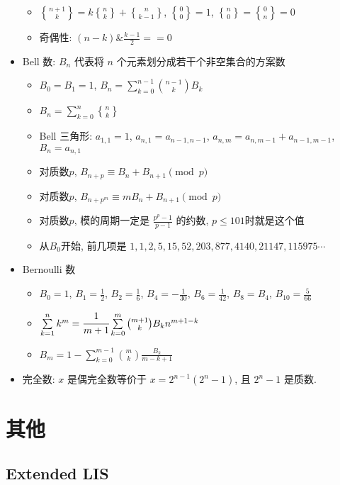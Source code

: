 \documentclass[landscape, twocolumn, 8pt, a4paper, twoside]{extarticle}
\newcommand{\stls}[2]{\genfrac{ \{ }{ \} }{0pt}{}{#1}{#2}}
\begin{document}
\begin{itemize}
\begin{itemize}
  \item $\stls{n + 1}{k} = k\stls{n}{k} + \stls{n}{k - 1}$, $\stls{0}{0} = 1$, $\stls{n}{0} = \stls{0}{n} = 0$
  \item 奇偶性: $(n - k) \& \frac{k - 1}{2} == 0$
  \end{itemize}
\item Bell 数: $B_n$ 代表将 $n$ 个元素划分成若干个非空集合的方案数
  \begin{itemize}
  \item $B_0 = B_1 = 1$, $B_n = \sum\limits_{k = 0}^{n - 1} \binom{n - 1}{k} B_k$
  \item $B_n = \sum\limits_{k = 0}^{n} \stls{n}{k} $
  \item Bell 三角形: $a_{1, 1} = 1$, $a_{n, 1} = a_{n - 1, n - 1}$, $a_{n, m} = a_{n, m - 1} + a_{n - 1, m - 1}$, $B_n = a_{n, 1}$
  \item 对质数$p$, $B_{n + p} \equiv B_n + B_{n + 1} \pmod{p}$
  \item 对质数$p$, $B_{n + p^m} \equiv mB_n + B_{n + 1} \pmod{p}$
  \item 对质数$p$, 模的周期一定是 $\frac{p^p - 1}{p - 1}$ 的约数, $p \le 101$时就是这个值
  \item 从$B_0$开始, 前几项是 $1, 1, 2, 5, 15, 52, 203, 877, 4140, 21147, 115975 \cdots$
  \end{itemize}
\item Bernoulli 数
  \begin{itemize}
  \item $B_0 = 1$, $B_1 = \frac{1}{2}$, $B_2 = \frac{1}{6}$, $B_4 = -\frac{1}{30}$, $B_6 = \frac{1}{42}$, $B_8 = B_4$, $B_{10} = \frac{5}{66}$
  \item $\sum\limits_{k = 1}^{n} k^m = \cfrac{1}{m + 1} \sum\limits_{k = 0}^{m} \binom{m + 1}{k} B_k n ^ {m + 1 - k} $
  \item $B_m = 1 - \sum\limits_{k = 0}^{m - 1} \binom{m}{k} \frac{B_k}{m - k + 1}$
  \end{itemize}
\item 完全数: $x$ 是偶完全数等价于 $x = 2^{n - 1} (2^n - 1)$, 且 $2^n - 1$ 是质数.
\end{itemize}

\section{其他}
\subsection{Extended LIS}

\end{document}
